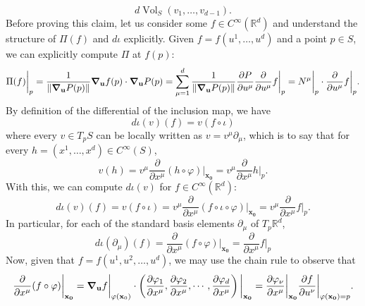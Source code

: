\documentclass{article}
\newcommand{\p}{\partial}
\newcommand{\R}{\mathbb{R}}
\newcommand{\f}[2]{\frac{#1}{#2}}
\theoremstyle{theorem}
\newcommand{\Vol}{\operatorname{Vol}}
\begin{document}
\begin{equation*}
    d\Vol_S(v_1,\dots,v_{d-1}).
\end{equation*}
Before proving this claim, let us consider some $f\in C^\infty(\R^d)$ and understand the structure of $\Pi(f)$ and $d\iota$ explicitly. Given $f = f(u^1,\dots,u^d)$ and a point $p\in S$, we can explicitly compute $\Pi$ at $f(p)$: 
\begin{equation*}
\Pi(f)\bigg\vert_p = \f{1}{\norm{\grad_{\bf{u}} P(p)}} \grad_{\bf{u}} f(p) \cdot \grad_{\bf{u}} P(p) 
= \sum^d_{\mu = 1} \f{1}{\norm{\grad_{\bf{u}} P(p)}} \f{\p P}{\p u^\mu} \f{\p}{\p u^\mu} f \bigg\vert_{p} 
= N^\mu\bigg\vert_{p}\cdot \f{\p}{\p u^\mu}f\bigg\vert_{p}.
\end{equation*}
By definition of the differential of the inclusion map, we have
\begin{equation*}
d\iota(v)(f)=v(f\circ\iota)
\end{equation*}
where every $v\in T_pS$ can be locally written as 
$v =v^\mu \p_\mu$, which is to say that for every $h = (x^1,\dots,x^{d})\in C^\infty(S)$, 
\begin{equation*}
    v(h) = v^\mu \f{\p}{\p x^\mu} (h\circ \varphi)\bigg\vert_{\mathbf{x_0}} = v^\mu \f{\p}{\p x^\mu} h \bigg\vert_{p}.
\end{equation*}
With this, we can compute $d\iota(v)$ for $f\in C^{\infty}(\R^d)$:
\begin{equation*}
d\iota(v)(f) =v(f\circ\iota)=v^{\mu}\frac{\partial}{\partial x^{\mu}}(f\circ\iota\circ\varphi)\bigg\vert_{\mathbf{x_0}}
=v^\mu\frac{\partial}{\partial x^{\mu}} f \bigg\vert_{p}.
\end{equation*}
In particular, for each of the standard basis elements $\p_\mu$ of $T_p\R^d$,
\begin{equation*}
d\iota(\partial_\mu)(f)=\frac{\partial}{\partial x^{\mu}}(f\circ\varphi)\bigg\vert_{\mathbf{x_0}} = \f{\p}{\p x^\mu} f \bigg\vert_{p}
\end{equation*}
Now, given that $f=f(u^1,u^2,\dots,u^d)$, we may use the chain rule to observe that
\begin{equation*}
\frac{\partial}{\partial x^{\mu}}(f\circ\varphi)\bigg\vert_{\mathbf{x_0}}=\grad_\mathbf{u}f\bigg\vert_{\varphi(\mathbf{x}_0)}\cdot\left(\frac{\partial\varphi_1}{\partial x^{\mu}},\frac{\partial\varphi_2}{\partial x^{\mu}},\cdots,\frac{\partial\varphi_d}{\partial x^{\mu}}\right)\bigg\vert_{\mathbf{x_0}}
= \f{\p \varphi_\nu}{\p x^\mu}\bigg\vert_{\mathbf{x_0}} \f{\p f}{\p u^\nu}\bigg\vert_{\varphi(\mathbf{x_0}) = p}.
\end{equation*}
\end{document}
